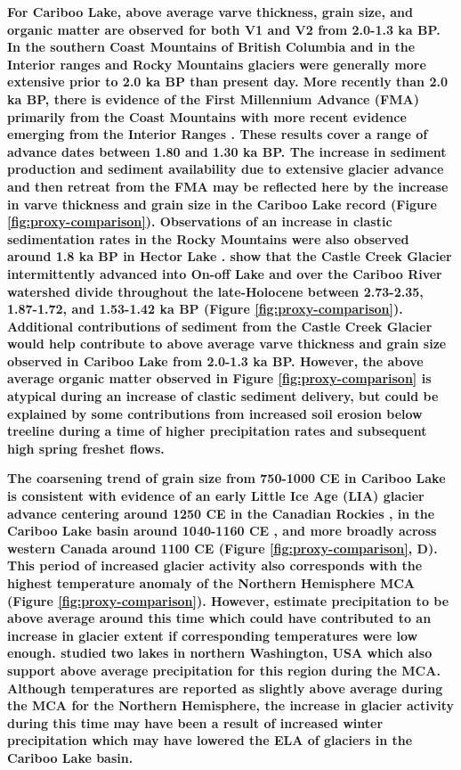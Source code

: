 \documentclass[Royal,times,doublespace,sageh]{sagej}
\begin{document}
\textbf{For Cariboo Lake, above average varve thickness, grain size, and
organic matter are observed for both V1 and V2 from 2.0-1.3 ka BP. In
the southern Coast Mountains of British Columbia
\citep{Koch2007a, Osborn2007, Allen2007, Clague2010} and in the Interior
ranges and Rocky Mountains \citep{Luckman1993, Luckman1995} glaciers
were generally more extensive prior to 2.0 ka BP than present day. More
recently than 2.0 ka BP, there is evidence of the First Millennium
Advance (FMA) primarily from the Coast Mountains
\citep{Reyes2006, Osborn2007} with more recent evidence emerging from
the Interior Ranges \citep{Maurer2012b}. These results cover a range of
advance dates between 1.80 and 1.30 ka BP. The increase in sediment
production and sediment availability due to extensive glacier advance
and then retreat from the FMA may be reflected here by the increase in
varve thickness and grain size in the Cariboo Lake record (Figure
\ref{fig:proxy-comparison}). Observations of an increase in clastic
sedimentation rates in the Rocky Mountains were also observed around 1.8
ka BP in Hector Lake \citep{Leonard1997}. \citet{Maurer2012b} show that
the Castle Creek Glacier intermittently advanced into On-off Lake and
over the Cariboo River watershed divide throughout the late-Holocene
between 2.73-2.35, 1.87-1.72, and 1.53-1.42 ka BP (Figure
\ref{fig:proxy-comparison}). Additional contributions of sediment from
the Castle Creek Glacier would help contribute to above average varve
thickness and grain size observed in Cariboo Lake from 2.0-1.3 ka BP.
However, the above average organic matter observed in Figure
\ref{fig:proxy-comparison} is atypical during an increase of clastic
sediment delivery, but could be explained by some contributions from
increased soil erosion below treeline during a time of higher
precipitation rates and subsequent high spring freshet flows.}

\textbf{The coarsening trend of grain size from 750-1000 CE in Cariboo
Lake is consistent with evidence of an early Little Ice Age (LIA)
glacier advance centering around 1250 CE in the Canadian Rockies
\citep{Luckman1995, Osborn2001, Leonard1997}, in the Cariboo Lake basin
around 1040-1160 CE \citep{Maurer2012b}, and more broadly across western
Canada around 1100 CE \citep{Solomina2016} (Figure
\ref{fig:proxy-comparison}, D). This period of increased glacier
activity also corresponds with the highest temperature anomaly of the
Northern Hemisphere MCA \citep{Moberg2005} (Figure
\ref{fig:proxy-comparison}). However, \citet{Ljungqvist2016} estimate
precipitation to be above average around this time which could have
contributed to an increase in glacier extent if corresponding
temperatures were low enough. \citet{Steinman2012} studied two lakes in
northern Washington, USA which also support above average precipitation
for this region during the MCA. Although temperatures are reported as
slightly above average during the MCA \citep{Moberg2005} for the
Northern Hemisphere, the increase in glacier activity during this time
may have been a result of increased winter precipitation which may have
lowered the ELA of glaciers in the Cariboo Lake basin.}
\end{document}
